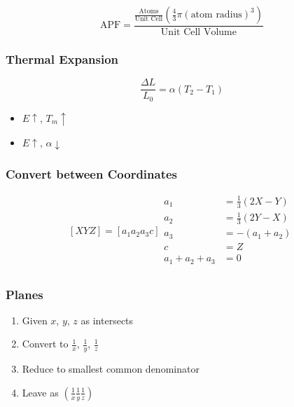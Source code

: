 			\begin{equation}
				\text{APF} = \frac{\frac{\text{Atoms}}{\text{Unit Cell}} \left( \frac{4}{3} \pi \left( \text{atom radius} \right)^{3} \right)}{\text{Unit Cell Volume}}
			\end{equation}	

		\subsubsection{Thermal Expansion}
			\begin{equation}
				\frac{\Delta L}{L_{0}} = \alpha \left( T_{2} - T_{1} \right)
			\end{equation}
			\begin{itemize}[noitemsep]
				\item $E \uparrow$, $T_{m} \uparrow$
				\item $E \uparrow$, $\alpha \downarrow$
			\end{itemize}

		\subsubsection{Convert between Coordinates}
			\begin{equation}
				\left[ XYZ \right] = \left[ a_{1} a_{2} a_{3} c \right]
				\begin{aligned}
					a_{1} &= \frac{1}{3} \left( 2X - Y \right) \\
					a_{2} &= \frac{1}{3} \left( 2Y - X \right) \\
					a_{3} &= - \left( a_{1} + a_{2} \right) \\
					c &= Z \\
					a_{1} + a_{2} + a_{3} &= 0 \\
				\end{aligned}
			\end{equation}
	
		\subsubsection{Planes}
			\begin{enumerate}[noitemsep]
				\item Given $x$, $y$, $z$ as intersects
				\item Convert to $\frac{1}{x}$, $\frac{1}{y}$, $\frac{1}{z}$
				\item Reduce to smallest common denominator
				\item Leave as $\left( \frac{1}{x} \frac{1}{y} \frac{1}{z} \right)$
			\end{enumerate}
	
